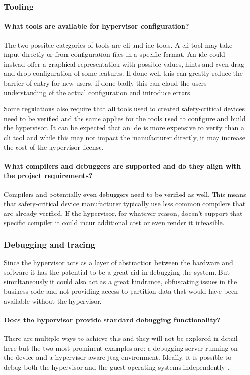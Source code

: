\subsubsection{Tooling}
\paragraph{What tools are available for hypervisor configuration?}
The two possible categories of tools are \acrshort{cli} and \acrshort{ide} tools. A \acrshort{cli} tool may take input directly or from configuration files in a specific format. An \acrshort{ide} could instead offer a graphical representation with possible values, hints and even drag and drop configuration of some features. If done well this can greatly reduce the barrier of entry for new users, if done badly this can cloud the users understanding of the actual configuration and introduce errors.

Some regulations also require that all tools used to created safety-critical devices need to be verified and the same applies for the tools used to configure and build the hypervisor. It can be expected that an \acrshort{ide} is more expensive to verify than a \acrshort{cli} tool and while this may not impact the manufacturer directly, it may increase the cost of the hypervisor license.
\paragraph{What compilers and debuggers are supported and do they align with the project requirements?}
Compilers and potentially even debuggers need to be verified as well. This means that safety-critical device manufacturer typically use less common compilers that are already verified. If the hypervisor, for whatever reason, doesn't support that specific compiler it could incur additional cost or even render it infeasible.
\subsubsection{Debugging and tracing}
Since the hypervisor acts as a layer of abstraction between the hardware and software it has the potential to be a great aid in debugging the system. But simultaneously it could also act as a great hindrance, obfuscating issues in the business code and not providing access to partition data that would have been available without the hypervisor.
\paragraph{Does the hypervisor provide standard debugging functionality?}
There are multiple ways to achieve this and they will not be explored in detail here but the two most prominent examples are: a debugging server running on the device and a hypervisor aware \acrshort{jtag} environment. Ideally, it is possible to debug both the hypervisor and the guest operating systems independently \cite{Lauterbach.2018}. 

